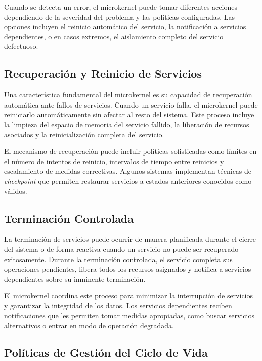 \documentclass[12pt,a4paper]{article}
\begin{document}
Cuando se detecta un error, el microkernel puede tomar diferentes acciones dependiendo de la severidad del problema y las políticas configuradas. Las opciones incluyen el reinicio automático del servicio, la notificación a servicios dependientes, o en casos extremos, el aislamiento completo del servicio defectuoso.

\subsection{Recuperación y Reinicio de Servicios}

Una característica fundamental del microkernel es su capacidad de recuperación automática ante fallos de servicios. Cuando un servicio falla, el microkernel puede reiniciarlo automáticamente sin afectar al resto del sistema. Este proceso incluye la limpieza del espacio de memoria del servicio fallido, la liberación de recursos asociados y la reinicialización completa del servicio.

El mecanismo de recuperación puede incluir políticas sofisticadas como límites en el número de intentos de reinicio, intervalos de tiempo entre reinicios y escalamiento de medidas correctivas. Algunos sistemas implementan técnicas de \textit{checkpoint} que permiten restaurar servicios a estados anteriores conocidos como válidos.

\subsection{Terminación Controlada}

La terminación de servicios puede ocurrir de manera planificada durante el cierre del sistema o de forma reactiva cuando un servicio no puede ser recuperado exitosamente. Durante la terminación controlada, el servicio completa sus operaciones pendientes, libera todos los recursos asignados y notifica a servicios dependientes sobre su inminente terminación.

El microkernel coordina este proceso para minimizar la interrupción de servicios y garantizar la integridad de los datos. Los servicios dependientes reciben notificaciones que les permiten tomar medidas apropiadas, como buscar servicios alternativos o entrar en modo de operación degradada.

\subsection{Políticas de Gestión del Ciclo de Vida}
\end{document}
